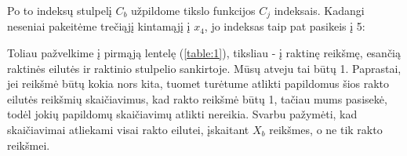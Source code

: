 \documentclass{article}
\begin{document}
\begin{table}[H]
    \centering
\end{table}
Po to indeksų stulpelį $C_b$ užpildome tikslo funkcijos $C_j$ indeksais. Kadangi neseniai pakeitėme trečiąjį kintamąjį į $x_4$, jo indeksas taip pat pasikeis į 5:
\begin{table}[H]
    \centering
\end{table}
Toliau pažvelkime į pirmąją lentelę (\ref{table:1}), tiksliau - į raktinę reikšmę, esančią raktinės eilutės ir raktinio stulpelio sankirtoje. Mūsų atveju tai būtų 1. Paprastai, jei reikšmė būtų kokia nors kita, tuomet turėtume atlikti papildomus šios rakto eilutės reikšmių skaičiavimus, kad rakto reikšmė būtų 1, tačiau mums pasisekė, todėl jokių papildomų skaičiavimų atlikti nereikia. Svarbu pažymėti, kad skaičiavimai atliekami visai rakto eilutei, įskaitant $X_b$ reikšmes, o ne tik rakto reikšmei.
\end{document}
